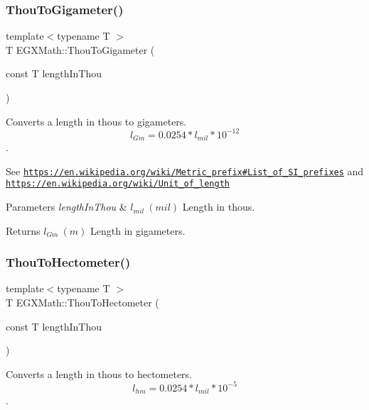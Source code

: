 \subsubsection{\texorpdfstring{Thou\+To\+Gigameter()}{ThouToGigameter()}}
{\footnotesize\ttfamily template$<$typename T $>$ \\
T E\+G\+X\+Math\+::\+Thou\+To\+Gigameter (\begin{DoxyParamCaption}\item[{const T}]{length\+In\+Thou }\end{DoxyParamCaption})}



Converts a length in thous to gigameters. \[ l_{Gm}=0.0254 * l_{mil} * 10^{-12} \]. 

See \href{https://en.wikipedia.org/wiki/Metric_prefix#List_of_SI_prefixes}{\tt https\+://en.\+wikipedia.\+org/wiki/\+Metric\+\_\+prefix\#\+List\+\_\+of\+\_\+\+S\+I\+\_\+prefixes} and \href{https://en.wikipedia.org/wiki/Unit_of_length}{\tt https\+://en.\+wikipedia.\+org/wiki/\+Unit\+\_\+of\+\_\+length} 
\begin{DoxyParams}{Parameters}
{\em length\+In\+Thou} & $ l_{mil}\ (mil)$ Length in thous. \\
\hline
\end{DoxyParams}
\begin{DoxyReturn}{Returns}
$ l_{Gm}\ (m)$ Length in gigameters. 
\end{DoxyReturn}
\mbox{\label{group___e_g_x_math-_conversions-_length_conversions-_imperial-_thou-_s_i_ga6493263a0400fe1dfa4ef0ab50be59de}} 
\subsubsection{\texorpdfstring{Thou\+To\+Hectometer()}{ThouToHectometer()}}
{\footnotesize\ttfamily template$<$typename T $>$ \\
T E\+G\+X\+Math\+::\+Thou\+To\+Hectometer (\begin{DoxyParamCaption}\item[{const T}]{length\+In\+Thou }\end{DoxyParamCaption})}



Converts a length in thous to hectometers. \[ l_{hm}=0.0254 * l_{mil} * 10^{-5} \]. 

